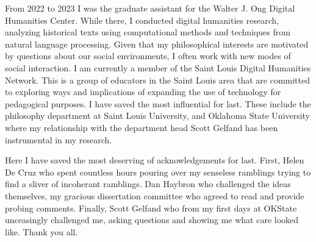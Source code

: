 \documentclass[phdthesis,12pt,final]{wuthesis}
\theoremstyle{definition}
\theoremstyle{definition}
\theoremstyle{definition}
\theoremstyle{definition}
\theoremstyle{remark}
\begin{document}
\begin{thesisacknowledgments}
From 2022 to 2023 I was the graduate assistant for the Walter J. Ong Digital Humanities Center. While there, I conducted digital humanities research, analyzing historical texts using computational methods and techniques from natural language processing. Given that my philosophical interests are motivated by questions about our social environments, I often work with new modes of social interaction. I am currently a member of the Saint Louis Digital Humanities Network. This is a group of educators in the Saint Louis area that are committed to exploring ways and implications of expanding the use of technology for pedagogical purposes. I have saved the most influential for last. These include the philosophy department at Saint Louis University, and Oklahoma State University where my relationship with the department head Scott Gelfand has been instrumental in my research.

Here I have saved the most deserving of acknowledgements for last. First, Helen De Cruz who spent countless hours pouring over my senseless ramblings trying to find a sliver of incoherant ramblings. Dan Haybron who challenged the ideas themselves, my gracious dissertation committee who agreed to read and provide probing comments. Finally, Scott Gelfand who from my first days at OKState unceasingly challenged me, asking questions and showing me what care looked like. Thank you all.
\end{thesisacknowledgments}


\listoffigures

\cleardoublepage
\begin{singlespace}
  \renewcommand\contentsname{\chapter*{Table of Contents}}
\tableofcontents
\end{singlespace}
\end{document}
